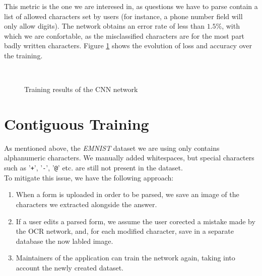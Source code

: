 \documentclass[11pt, a4paper]{report}
\def\code#1{\texttt{#1}}
\begin{document}
This metric is the one we are interesed in, as questions we have to parse contain a list of allowed characters set by users (for instance, a phone number field will only allow digits). The network obtains an error rate of less than $1.5\%$, with which we are confortable, as the misclassified characters are for the most part badly written characters. Figure \ref{ocr-results} shows the evolution of loss and accuracy over the training. 


\begin{figure}[!h]
	\begin{center}
		\\
	\end{center}
	\caption{Training results of the CNN network}
	\label{ocr-results}
\end{figure}

\section{Contiguous Training}

As mentioned above, the \textit{EMNIST} dataset we are using only contains alphanumeric characters. We manually added whitespaces, but special characters such as '\code{+}', '\code{-}', '\code{@}' etc. are still not present in the dataset.
\\
To mitigate this issue, we have the following approach:
\begin{enumerate}
	\item When a form is uploaded in order to be parsed, we save an image of the characters we extracted alongside the answer.
	\item If a user edits a parsed form, we assume the user corected a mistake made by the OCR network, and, for each modified character, save in a separate database the now labled image.
	\item Maintainers of the application can train the network again, taking into account the newly created dataset.
\end{enumerate}
\end{document}
